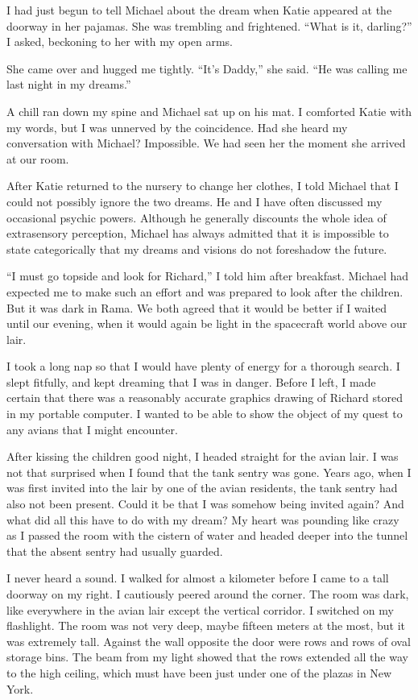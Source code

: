 \documentclass[]{article}
\begin{document}
I had just begun to tell Michael about the dream when Katie appeared at the doorway in her pajamas.  She was trembling and frightened.  “What is it, darling?” I asked, beckoning to her with my open arms.

She came over and hugged me tightly.  “It’s Daddy,” she said.  “He was calling me last night in my dreams.”

A chill ran down my spine and Michael sat up on his mat.  I comforted Katie with my words, but I was unnerved by the coincidence.  Had she heard my conversation with Michael? Impossible.  We had seen her the moment she arrived at our room.

After Katie returned to the nursery to change her clothes, I told Michael that I could not possibly ignore the two dreams.  He and I have often discussed my occasional psychic powers.  Although he generally discounts the whole idea of extrasensory perception, Michael has always admitted that it is impossible to state categorically that my dreams and visions do not foreshadow the future.

“I must go topside and look for Richard,” I told him after breakfast.  Michael had expected me to make such an effort and was prepared to look after the children.  But it was dark in Rama.  We both agreed that it would be better if I waited until our evening, when it would again be light in the spacecraft world above our lair.

I took a long nap so that I would have plenty of energy for a thorough search.  I slept fitfully, and kept dreaming that I was in danger.  Before I left, I made certain that there was a reasonably accurate graphics drawing of Richard stored in my portable computer.  I wanted to be able to show the object of my quest to any avians that I might encounter.

After kissing the children good night, I headed straight for the avian lair.  I was not that surprised when I found that the tank sentry was gone.  Years ago, when I was first invited into the lair by one of the avian residents, the tank sentry had also not been present.  Could it be that I was somehow being invited again? And what did all this have to do with my dream? My heart was pounding like crazy as I passed the room with the cistern of water and headed deeper into the tunnel that the absent sentry had usually guarded.

I never heard a sound.  I walked for almost a kilometer before I came to a tall doorway on my right.  I cautiously peered around the corner.  The room was dark, like everywhere in the avian lair except the vertical corridor.  I switched on my flashlight.  The room was not very deep, maybe fifteen meters at the most, but it was extremely tall.  Against the wall opposite the door were rows and rows of oval storage bins.  The beam from my light showed that the rows extended all the way to the high ceiling, which must have been just under one of the plazas in New York.
\end{document}
